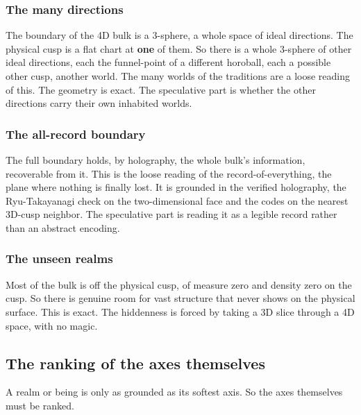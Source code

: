 \subsubsection{The many directions}

The boundary of the 4D bulk is a 3-sphere, a whole space of ideal
directions. The physical cusp is a flat chart at \textbf{one} of them. So
there is a whole 3-sphere of other ideal directions, each the funnel-point
of a different horoball, each a possible other cusp, another world. The
many worlds of the traditions are a loose reading of this. The geometry is
exact. The speculative part is whether the other directions carry their own
inhabited worlds.

\subsubsection{The all-record boundary}

The full boundary holds, by holography, the whole bulk's information,
recoverable from it. This is the loose reading of the record-of-everything,
the plane where nothing is finally lost. It is grounded in the verified
holography, the Ryu-Takayanagi check on the two-dimensional face and the
codes on the nearest 3D-cusp neighbor. The speculative part is reading it as
a legible record rather than an abstract encoding.

\subsubsection{The unseen realms}

Most of the bulk is off the physical cusp, of measure zero and density zero
on the cusp. So there is genuine room for vast structure that never shows on
the physical surface. This is exact. The hiddenness is forced by taking a
3D slice through a 4D space, with no magic.

\subsection{The ranking of the axes themselves}

A realm or being is only as grounded as its softest axis. So the axes
themselves must be ranked.


